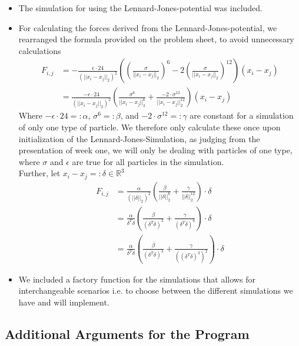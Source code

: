 \documentclass{article}
\begin{document}
\begin{itemize}
    \item The simulation for using the Lennard-Jones-potential was included.
    \item For calculating the forces derived from the Lennard-Jones-potential, we rearranged the formula provided on the problem sheet, to avoid unnecessary calculations
    \begin{align}
        F_{i,j} &= -\frac{\epsilon \cdot 24}{(||x_i-x_j||_2)^2} \left( \left( \frac{\sigma}{||x_i-x_j||_2} \right) ^6 - 2 \left( \frac{\sigma}{||x_i-x_j||_2} \right) ^{12} \right) (x_i-x_j) \\
                &= \frac{-\epsilon \cdot 24}{(||x_i-x_j||_2)^2} \left(  \frac{\sigma ^6 }{||x_i-x_j||_2 ^6 } + \frac{-2 \cdot \sigma^{12}}{||x_i-x_j||_2^{12}}  \right) (x_i-x_j)
    \end{align}
    Where  $-\epsilon \cdot 24 =: \alpha$, $\sigma ^6 =: \beta$, and $-2 \cdot \sigma^{12} =: \gamma$ are constant for a simulation of only one type of particle. We therefore only calculate these once upon initialization of the Lennard-Jones-Simulation, as judging from the presentation of week one, we will only be dealing with particles of one type, where $\sigma$ and $\epsilon$ are true for all particles in the simulation. \\
    Further, let $x_i-x_j =: \delta \in \mathbb{R}^3$
    \begin{align}
        F_{i,j} &= \frac{\alpha}{(||\delta||_2)^2} \left(  \frac{\beta}{||\delta||_2 ^6 } + \frac{\gamma}{||\delta||_2^{12}}  \right) \cdot \delta \\
        &= \frac{\alpha}{\delta ^T\delta} \left(  \frac{\beta}{(\delta ^T\delta) ^3} + \frac{\gamma}{(\delta ^T\delta) ^6}  \right) \cdot \delta \\
        &= \frac{\alpha}{\delta ^T\delta} \left(  \frac{\beta}{(\delta ^T\delta) ^3} + \frac{\gamma}{((\delta ^T\delta) ^3) ^2}  \right) \cdot \delta
    \end{align} 
    \item We included a factory function for the simulations that allows for interchangeable scenarios i.e. to choose between the different simulations we have and will implement.
\end{itemize}

\subsection{Additional Arguments for the Program}
\label{subsec:arg}
\end{document}
